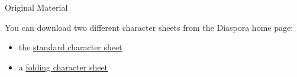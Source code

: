 \begin{sidebox}{Original Material}

You can download two different character sheets from the Diaspora home page:

\begin{itemize}
\item the \href{http://www.phreeow.net/Diaspora/Diaspora%20character%20sheet.pdf}{standard character sheet}
\item a \href{http://www.phreeow.net/Diaspora/Diaspora%20character%20sheet%20con.pdf}{folding character sheet}
\end{itemize}

\end{sidebox}
